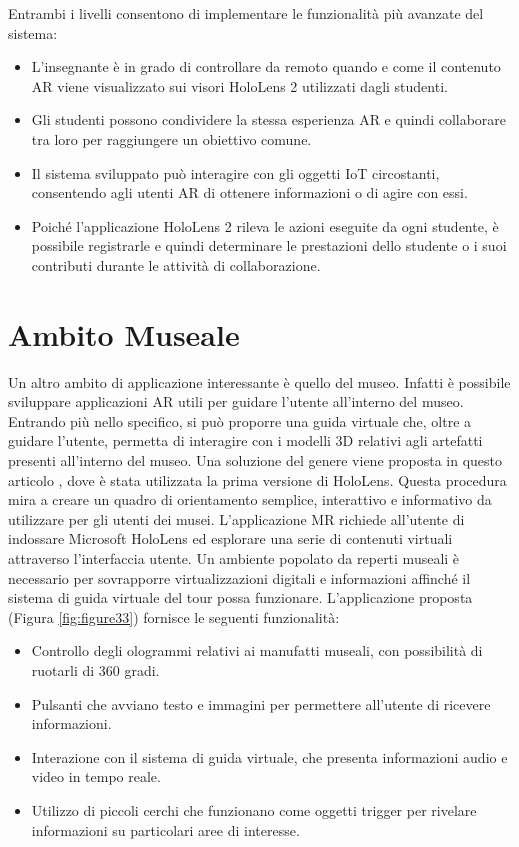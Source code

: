 Entrambi i livelli consentono di implementare le funzionalità più avanzate del sistema:

\begin{itemize}
    \item L'insegnante è in grado di controllare da remoto quando e come il contenuto AR viene visualizzato sui visori HoloLens 2 utilizzati dagli studenti.
    \item Gli studenti possono condividere la stessa esperienza AR e quindi collaborare tra loro per raggiungere un obiettivo comune.
    \item Il sistema sviluppato può interagire con gli oggetti IoT circostanti, consentendo agli utenti AR di ottenere informazioni o di agire con essi.
    \item Poiché l'applicazione HoloLens 2 rileva le azioni eseguite da ogni studente, è possibile registrarle e quindi determinare le prestazioni dello studente o i suoi contributi durante le attività di collaborazione.
\end{itemize}

\section{Ambito Museale}\label{sec:Sezione3.4}
Un altro ambito di applicazione interessante è quello del museo.
Infatti è possibile sviluppare applicazioni AR utili per guidare l'utente all'interno del museo.
Entrando più nello specifico, si può proporre una guida virtuale che, oltre a guidare l'utente, permetta di interagire con i modelli 3D relativi agli artefatti presenti all'interno del museo.
Una soluzione del genere viene proposta in questo articolo \cite{HoloLens-in-museum}, dove è stata utilizzata la prima versione di HoloLens.
Questa procedura mira a creare un quadro di orientamento semplice, interattivo e informativo da utilizzare per gli utenti dei musei. L'applicazione MR richiede all'utente di indossare Microsoft HoloLens ed esplorare una serie di contenuti virtuali attraverso l'interfaccia utente. Un ambiente popolato da reperti museali è necessario per sovrapporre virtualizzazioni digitali e informazioni affinché il sistema di guida virtuale del tour possa funzionare. 
L'applicazione proposta (Figura \ref{fig:figure33}) fornisce le seguenti funzionalità:
\begin{itemize}
    \item Controllo degli ologrammi relativi ai manufatti museali, con possibilità di ruotarli di 360 gradi.
    \item Pulsanti che avviano testo e immagini per permettere all'utente di ricevere informazioni.
    \item Interazione con il sistema di guida virtuale, che presenta informazioni audio e video in tempo reale.
    \item Utilizzo di piccoli cerchi che funzionano come oggetti trigger per rivelare informazioni su particolari aree di interesse.
\end{itemize}

